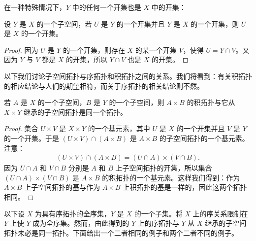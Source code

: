 \documentclass[../../main.tex]{subfiles}
\begin{document}
在一种特殊情况下，$Y$ 中的任何一个开集也是 $X$ 中的开集：

\begin{lemma}[子空间开集为全空间开集的条件]\label{lemma:ch02-子空间开集条件}
设 $Y$ 是 $X$ 的一个子空间，若 $U$ 是 $Y$ 的一个开集并且 $Y$ 是 $X$ 的一个开集，则 $U$ 是 $X$ 的一个开集。
\end{lemma}

\begin{proof}
因为 $U$ 是 $Y$ 的一个开集，则存在 $X$ 的某一个开集 $V$，使得 $U = Y \cap V$。又因为 $Y$ 与 $V$ 都是 $X$ 的开集，所以 $Y \cap V$ 也是 $X$ 的开集。
\end{proof}

以下我们讨论子空间拓扑与序拓扑和积拓扑之间的关系。我们将看到：有关积拓扑的相应结论与人们的期望相符，而关于序拓扑的相关结论则不然。

\begin{theorem}[积拓扑与子空间拓扑一致]\label{theorem:ch02-积子空间一致}
若 $A$ 是 $X$ 的一个子空间，$B$ 是 $Y$ 的一个子空间，则 $A \times B$ 的积拓扑与它从 $X \times Y$ 继承的子空间拓扑是同一个拓扑。
\end{theorem}

\begin{proof}
集合 $U \times V$ 是 $X \times Y$ 的一个基元素，其中 $U$ 是 $X$ 的一个开集并且 $V$ 是 $Y$ 的一个开集。于是 $(U \times V) \cap (A \times B)$ 是 $A \times B$ 的子空间拓扑的一个基元素。注意：
\begin{align*}
(U \times V) \cap (A \times B) = (U \cap A) \times (V \cap B).
\end{align*}
因为 $U \cap A$ 和 $V \cap B$ 分别是 $A$ 和 $B$ 上子空间拓扑的开集，所以集合 $(U \cap A) \times (V \cap B)$ 是 $A \times B$ 的积拓扑的一个基元素。这样我们得到：作为 $A \times B$ 上子空间拓扑的基与作为 $A \times B$ 上积拓扑的基是一样的，因此这两个拓扑相同。
\end{proof}

以下设 $X$ 为具有序拓扑的全序集，$Y$ 是 $X$ 的一个子集。将 $X$ 上的序关系限制在 $Y$ 上使 $Y$ 成为全序集。然而，由此得到的 $Y$ 上的序拓扑与 $Y$ 从 $X$ 继承的子空间拓扑未必是同一拓扑。下面给出一个二者相同的例子和两个二者不同的例子。
\end{document}
